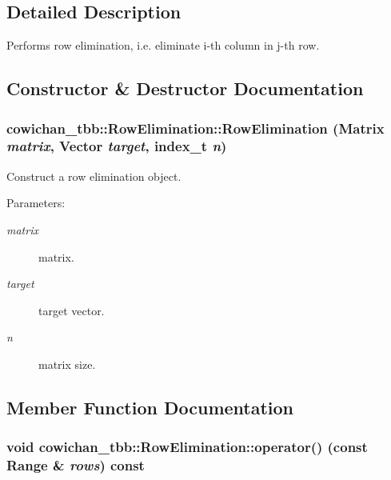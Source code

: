 \subsection{Detailed Description}
Performs row elimination, i.e. eliminate i-th column in j-th row. 

\subsection{Constructor \& Destructor Documentation}
\hypertarget{classcowichan__tbb_1_1_row_elimination_917509da76905d645488e5f387ee9562}{
\subsubsection[{RowElimination}]{\setlength{\rightskip}{0pt plus 5cm}cowichan\_\-tbb::RowElimination::RowElimination ({\bf Matrix} {\em matrix}, \/  {\bf Vector} {\em target}, \/  {\bf index\_\-t} {\em n})}}
\label{classcowichan__tbb_1_1_row_elimination_917509da76905d645488e5f387ee9562}


Construct a row elimination object. \begin{Desc}
\item[Parameters:]
\begin{description}
\item[{\em matrix}]matrix. \item[{\em target}]target vector. \item[{\em n}]matrix size. \end{description}
\end{Desc}


\subsection{Member Function Documentation}
\hypertarget{classcowichan__tbb_1_1_row_elimination_1123e0c48e52628a0e543bbd75d2086f}{
\subsubsection[{operator()}]{\setlength{\rightskip}{0pt plus 5cm}void cowichan\_\-tbb::RowElimination::operator() (const {\bf Range} \& {\em rows}) const}}
\label{classcowichan__tbb_1_1_row_elimination_1123e0c48e52628a0e543bbd75d2086f}


